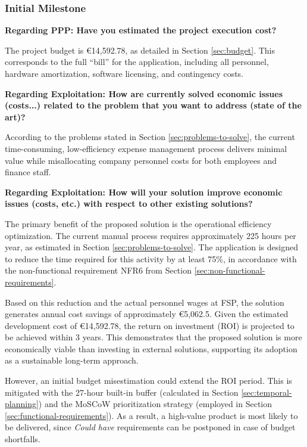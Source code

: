 \subsubsection{Initial Milestone}

\textbf{Regarding PPP: Have you estimated the project execution cost?}
\vspace{-5pt}

The project budget is €14,592.78, as detailed in Section \ref{sec:budget}. This corresponds to the full ``bill'' for the application, including all personnel, hardware amortization, software licensing, and contingency costs.

\vspace{2cm}

\textbf{Regarding Exploitation: How are currently solved economic issues (costs...) related to the problem that you want to address (state of the art)?}
\vspace{-5pt}

According to the problems stated in Section \ref{sec:problems-to-solve}, the current time-consuming, low-efficiency expense management process delivers minimal value while misallocating company personnel costs for both employees and finance staff.


\textbf{Regarding Exploitation: How will your solution improve economic issues (costs, etc.) with respect to other existing solutions?}
\vspace{-5pt}

The primary benefit of the proposed solution is the operational efficiency optimization. The current manual process requires approximately 225 hours per year, as estimated in Section \ref{sec:problems-to-solve}. The application is designed to reduce the time required for this activity by at least 75\%, in accordance with the non-functional requirement NFR6 from Section \ref{sec:non-functional-requirements}.

Based on this reduction and the actual personnel wages at FSP, the solution generates annual cost savings of approximately €5,062.5. Given the estimated development cost of €14,592.78, the return on investment (ROI) is projected to be achieved within 3 years. This demonstrates that the proposed solution is more economically viable than investing in external solutions, supporting its adoption as a sustainable long-term approach.

However, an initial budget misestimation could extend the ROI period. This is mitigated with the 27-hour built-in buffer (calculated in Section \ref{sec:temporal-planning}) and the MoSCoW prioritization strategy (employed in Section \ref{sec:functional-requirements}). As a result, a high-value product is most likely to be delivered, since \textit{Could have} requirements can be postponed in case of budget shortfalls. 

